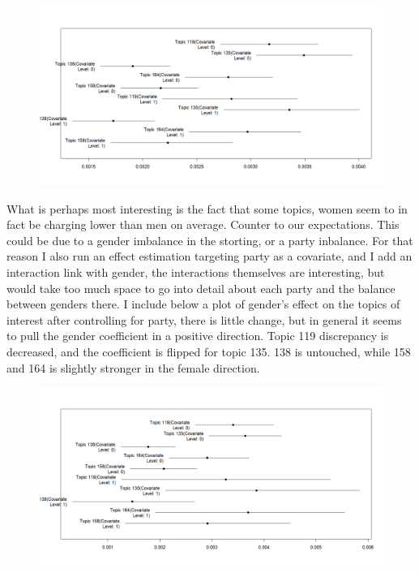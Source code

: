 \documentclass[12pt]{article}
\begin{document}
	\begin{figure}[h]
		\centering
		\includegraphics[scale=0.60]{gndr_estimate.jpg}
	\end{figure}
	
	What is perhaps most interesting is the fact that some topics, women seem to in fact be charging lower than men on average. Counter to our expectations. This could be due to a gender imbalance in the storting, or a party inbalance. For that reason I also run an effect estimation targeting party as a covariate, and I add an interaction link with gender, the interactions themselves are interesting, but would take too much space to go into detail about each party and the balance between genders there. I include below a plot of gender's effect on the topics of interest after controlling for party, there is little change, but in general it seems to pull the gender coefficient in a positive direction. Topic 119 discrepancy is decreased, and the coefficient is flipped for topic 135. 138 is untouched, while 158 and 164 is slightly stronger in the female direction. 
	
	\begin{figure}[h]
		\centering
		\includegraphics[scale=0.60]{gndr_estimate_full.jpg}
	\end{figure}
	
\end{document}
